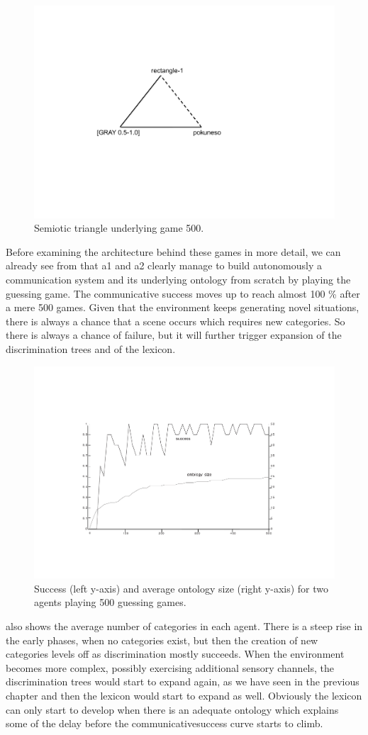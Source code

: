 \begin{figure}[htbp]
  \centerline{\includegraphics[width=.45\textwidth]{chap6/figs/triangle2.pdf}}
\caption{\label{triangle2}Semiotic triangle 
underlying game 500.}
\end{figure}

Before examining the architecture behind these
games in more detail, we can 
already see from  that
{\bfshape  a1} and {\bfshape  a2} clearly manage to build autonomously 
a communication system and its underlying ontology
from scratch by playing the 
guessing game. The communicative success 
moves up to reach almost 100 \% after a mere 500 games. 
Given that the environment keeps generating novel 
situations, there is always a chance that a 
scene occurs which requires new categories. So there 
is always a chance of failure, but it will 
further trigger expansion of the discrimination 
trees and of the lexicon. 


\begin{figure}[htbp]
  \centerline{\includegraphics[width=\textwidth]{chap6/figs/gsucc1.pdf}}
\caption{\label{gsuccess1}Success 
(left y-axis) and average ontology size
(right y-axis) for two agents playing 500
guessing games.} 
\end{figure}
 also shows the average 
number of categories in each agent. There is a 
steep rise in the early phases, when no categories
exist, but then the creation of new categories levels 
off as discrimination mostly succeeds. When the 
environment becomes more complex, possibly exercising
additional sensory channels, the discrimination
trees would start to expand again, as we have seen 
in the previous chapter and then the lexicon 
would start to expand as well. Obviously the lexicon can only 
start to develop when there is an adequate ontology which 
explains some of the delay before the communicativesuccess curve starts to climb. 


